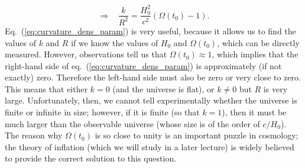 \begin{equation} \label{eq:curvature_dens_param}
\Rightarrow~~~~\frac{k}{R^2}=\frac{H_0^2}{c^2}\left(\Omega(t_0)-1\right).
\end{equation}
Eq.\ (\ref{eq:curvature_dens_param}) is very useful, because it allows us to find the values of $k$ and $R$ if we know the values of $H_0$ and $\Omega(t_0)$, which can be directly measured. However, observations tell us that $\Omega(t_0)\approx1$, which implies that the right-hand side of eq.\ (\ref{eq:curvature_dens_param}) is approximately (if not exactly) zero. Therefore the left-hand side must also be zero or very close to zero. This means that either $k=0$ (and the universe is flat), or $k\neq0$ but $R$ is very large. Unfortunately, then, we cannot tell experimentally whether the universe is finite or infinite in size; however, if it is finite (so that $k=1$), then it must be much larger than the observable universe (whose size is of the order of $c/H_0$). The reason why $\Omega(t_0)$ is so close to unity is an important puzzle in cosmology; the theory of inflation (which we will study in a later lecture) is widely believed to provide the correct solution to this question.


